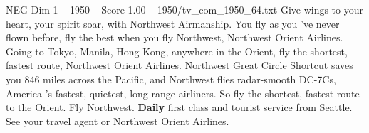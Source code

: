 \begin{textsample}{NEG Dim 1 – 1950 – Score 1.00 – 1950/tv\_com\_1950\_64.txt}  \label{ex:f1_neg_082}
Give wings to your heart, your spirit soar, with Northwest Airmanship.
You fly as you 've never flown before, fly the best when you fly Northwest, Northwest Orient Airlines.
Going to Tokyo, Manila, Hong Kong, anywhere in the Orient, fly the shortest, fastest route, Northwest Orient Airlines.
Northwest Great Circle Shortcut saves you 846 miles across the Pacific, and Northwest flies radar-smooth DC-7Cs, America 's fastest, quietest, long-range airliners.
So fly the shortest, fastest route to the Orient.
Fly Northwest. \textbf{Daily} first class and tourist service from Seattle.
See your travel agent or Northwest Orient Airlines.

\end{textsample}
